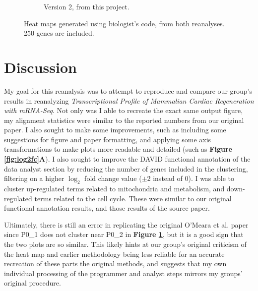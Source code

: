 \documentclass{article}
\begin{document}
\begin{landscape}
\begin{figure}
\begin{subfigure}[b]{0.68\textwidth}
         \caption{Version 2, from this project.}  
     \end{subfigure}
        \caption{Heat maps generated using biologist's code, from both reanalyses. 250 genes are included.}
        \label{fig:compare}
\end{figure}
\end{landscape}

\section{Discussion}
My goal for this reanalysis was to attempt to reproduce and compare our group's results in reanalyzing \textit{Transcriptional Profile of Mammalian Cardiac Regeneration with mRNA-Seq}. Not only was I able to recreate the exact same output figure, my alignment statistics were similar to the reported numbers from our original paper. I also sought to make some improvements, such as including some suggestions for figure and paper formatting, and applying some axis transformations to make plots more readable and detailed (such as \textbf{Figure \ref{fig:log2fc}A}). I also sought to improve the DAVID functional annotation of the data analyst section by reducing the number of genes included in the clustering, filtering on a higher $\log_2$ fold change value ($\pm$2 instead of 0). I was able to cluster up-regulated terms related to mitochondria and metabolism, and down-regulated terms related to the cell cycle. These were similar to our original functional annotation results, and those results of the source paper.

Ultimately, there is still an error in replicating the original O'Meara et al. paper since P0\_1 does not cluster near P0\_2 in \textbf{Figure \ref{fig:compare}}, but it is a good sign that the two plots are so similar. This likely hints at our group's original criticism of the heat map and earlier methodology being less reliable for an accurate recreation of these parts the original methods, and suggests that my own individual processing of the programmer and analyst steps mirrors my groups' original procedure.

\printbibliography
\end{document}
